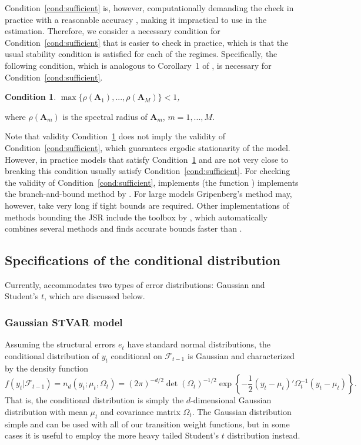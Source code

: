 \documentclass[nojss]{jss}
\newtheorem{condition}{Condition}
\begin{document}
Condition~\ref{cond:sufficient} is, however, computationally demanding the check in practice with a reasonable accuracy \citep[e.g.,][]{Chang+Blondel:2013}, making it impractical to use in the estimation. Therefore, we consider a necessary condition for Condition~\ref{cond:sufficient} that is easier to check in practice, which is that the usual stability condition is satisfied for each of the regimes. Specifically, the following condition, which is analogous to Corollary~1 of \cite{Kheifets+Saikkonen:2020}, is necessary for Condition~\ref{cond:sufficient}.
\begin{condition}\label{cond:necessary}
$\max\lbrace \rho(\boldsymbol{A}_1),...,\rho(\boldsymbol{A}_M)\rbrace<1$,
\end{condition}
where $\rho(\boldsymbol{A}_m)$ is the spectral radius of $\boldsymbol{A}_m$, $m=1,...,M$.

Note that validity Condition~\ref{cond:necessary} does not imply the validity of Condition~\ref{cond:sufficient}, which guarantees ergodic stationarity of the model. However, in practice models that satisfy Condition~\ref{cond:necessary} and are not very close to breaking this condition usually satisfy Condition~\ref{cond:sufficient}. For checking the validity of Condition~\ref{cond:sufficient},  implements (the function ) implements the branch-and-bound method by \cite{Gripenberg:1996}. For large models Gripenberg's method may, however, take very long if tight bounds are required. Other implementations of methods bounding the JSR include the  toolbox  by \cite{Jungers:2023}, which automatically combines several methods and finds accurate bounds faster than .

\subsection{Specifications of the conditional distribution}\label{sec:cond_dist}
Currently,  accommodates two types of error distributions: Gaussian and Student's $t$, which are discussed below.

\subsubsection{Gaussian STVAR model}
Assuming the structural errors $e_t$ have standard normal distributions, the conditional distribution of $y_t$ conditional on $\mathcal{F}_{t-1}$ is Gaussian and characterized by the density function
\begin{equation}
f(y_t|\mathcal{F}_{t-1}) = n_d(y_t;\mu_{t},\Omega_{t})=(2\pi)^{-d/2}\det(\Omega_t)^{-1/2}\exp\left\lbrace -\frac{1}{2}(y_t - \mu_t)'\Omega_t^{-1}(y_t - \mu_t) \right\rbrace .
\end{equation}
That is, the conditional distribution is simply the $d$-dimensional Gaussian distribution with mean $\mu_t$ and covariance matrix $\Omega_t$. The Gaussian distribution simple and can be used with all of our transition weight functions, but in some cases it is useful to employ the more heavy tailed Student's $t$ distribution instead.
\end{document}
